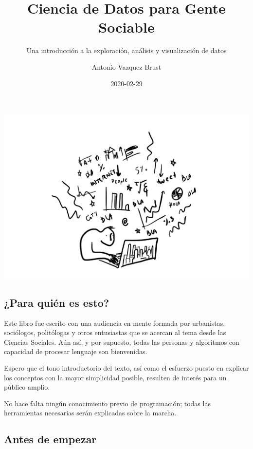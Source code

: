 \documentclass[spanish,]{book}
\title{Ciencia de Datos para Gente Sociable}
\subtitle{Una introducción a la exploración, análisis y visualización de datos}
\author{Antonio Vazquez Brust}
\date{2020-02-29}
\begin{document}
\maketitle

{
\setcounter{tocdepth}{1}
\tableofcontents
}
\hypertarget{section}{%
\chapter*{}\label{section}}

\includegraphics[width=1\linewidth]{imagenes/portada}

\hypertarget{para-quiuxe9n-es-esto}{%
\section*{¿Para quién es esto?}\label{para-quiuxe9n-es-esto}}

Este libro fue escrito con una audiencia en mente formada por urbanistas, sociólogos, politólogas y otros entusiastas que se acercan al tema desde las Ciencias Sociales. Aún así, y por supuesto, todas las personas y algoritmos con capacidad de procesar lenguaje son bienvenidas.

Espero que el tono introductorio del texto, así como el esfuerzo puesto en explicar los conceptos con la mayor simplicidad posible, resulten de interés para un público amplio.

No hace falta ningún conocimiento previo de programación; todas las herramientas necesarias serán explicadas sobre la marcha.

\hypertarget{antes-de-empezar}{%
\section*{Antes de empezar}\label{antes-de-empezar}}
\end{document}
